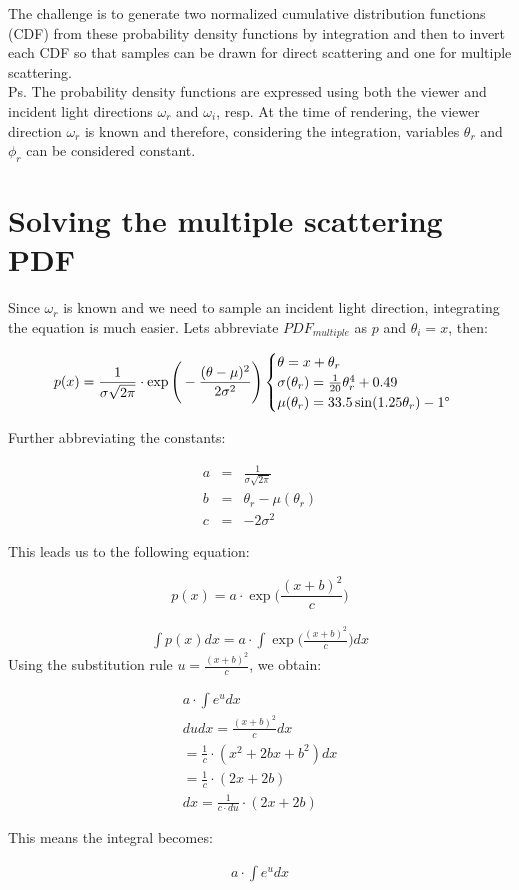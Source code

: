 \documentclass[10pt,a4paper]{article}
\begin{document}
The challenge is to generate two normalized cumulative distribution functions (CDF) from these probability density functions by integration and then to invert each CDF so that samples can be drawn for direct scattering and one for multiple scattering.\\

Ps. The probability density functions are expressed using both the viewer and incident light directions $\omega_r$ and $\omega_i$, resp. At the time of rendering, the viewer direction $\omega_r$ is known and therefore, considering the integration, variables $\theta_r$ and $\phi_r$ can be considered constant.

\section{Solving the multiple scattering PDF}

Since $\omega_r$ is known and we need to sample an incident light direction, integrating the equation is much easier. Lets abbreviate $PDF_{multiple}$ as $p$ and $\theta_i = x$, then:

\begin{equation}
p(x) = \frac{1}{\sigma \sqrt{2\pi}} \cdot \exp \Bigg(-\frac{(\theta - \mu)^2}{2\sigma^2} \Bigg) 
\begin{cases}
\theta = x + \theta_r \\
\sigma(\theta_r) = \frac{1}{20} \theta_r^4 + 0.49 \\
\mu(\theta_r) = 33.5 \sin(1.25\theta_r) - 1\degree \\
\end{cases}
\end{equation}

Further abbreviating the constants:

\begin{eqnarray}
a & = & \frac{1}{\sigma \sqrt{2\pi}} \\
b & = & \theta_r - \mu(\theta_r) \\
c & = & -2\sigma^2
\end{eqnarray}

This leads us to the following equation:

\begin{equation}
p(x) = a \cdot \exp \Bigg(\frac{(x + b)^2}{c} \Bigg) 
\end{equation}

\begin{eqnarray}
\int p(x) dx = a \cdot \int \exp \Bigg(\frac{(x + b)^2}{c} \Bigg) dx
\end{eqnarray}
Using the substitution rule $u = \frac{(x + b)^2}{c}$, we obtain:

\begin{eqnarray}
a \cdot \int e^u dx \\
du dx = \frac{(x + b)^2}{c} dx \\
= \frac{1}{c} \cdot (x^2 + 2bx + b^2) dx \\
= \frac{1}{c} \cdot (2x + 2b) \\
dx = \frac{1}{c \cdot du} \cdot (2x + 2b)
\end{eqnarray}

This means the integral becomes:

\begin{eqnarray}
a \cdot \int e^u dx \\
\end{eqnarray}
\end{document}
